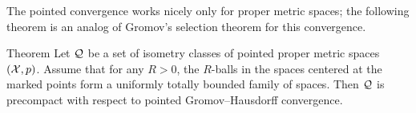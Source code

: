 The pointed convergence works nicely only for proper metric spaces;
the following theorem is an analog of Gromov's selection theorem for this convergence.

\begin{thm}{Theorem}\label{thm:pointed-gromov-compactness}%
Let $\mathcal{Q}$ be a set of isometry classes of pointed proper metric spaces
$(\mathcal{X},p)$.
Assume that for any $R>0$, the $R$-balls in the spaces centered at the marked points form a uniformly totally bounded family of spaces.
Then $\mathcal{Q}$ is precompact with respect to pointed Gromov--Hausdorff convergence. 
\end{thm}






